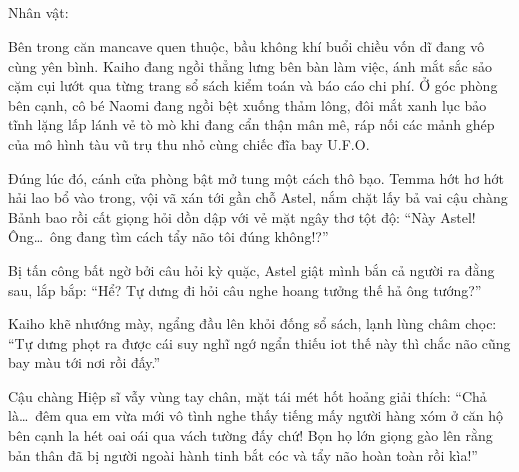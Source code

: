 \documentclass[../main.tex]{subfiles}
\begin{document}

\vspace{-60pt}

\subsection*{\label{ep-M34.I}}
\vspace{-4pt}
\begin{center}
    {\caviar\fontsize{12pt}{12pt}\selectfont Nhân vật:    }
\end{center}

Bên trong căn mancave quen thuộc, bầu không khí buổi chiều vốn dĩ đang vô cùng yên bình. Kaiho đang ngồi thẳng lưng bên bàn làm việc, ánh mắt sắc sảo cặm cụi lướt qua từng trang sổ sách kiểm toán và báo cáo chi phí. Ở góc phòng bên cạnh, cô bé Naomi đang ngồi bệt xuống thảm lông, đôi mắt xanh lục bảo tĩnh lặng lấp lánh vẻ tò mò khi đang cẩn thận mân mê, ráp nối các mảnh ghép của mô hình tàu vũ trụ thu nhỏ cùng chiếc đĩa bay U.F.O.

Đúng lúc đó, cánh cửa phòng bật mở tung một cách thô bạo.  Temma hớt hơ hớt hải lao bổ vào trong, vội vã xán tới gần chỗ  Astel, nắm chặt lấy bả vai cậu chàng Bảnh bao rồi cất giọng hỏi dồn dập với vẻ mặt ngây thơ tột độ: ``Này Astel! Ông\dots\ ông đang tìm cách tẩy não tôi đúng không!?''

Bị tấn công bất ngờ bởi câu hỏi kỳ quặc, Astel giật mình bắn cả người ra đằng sau, lắp bắp: ``Hể? Tự dưng đi hỏi câu nghe hoang tưởng thế hả ông tướng?''


Kaiho khẽ nhướng mày, ngẩng đầu lên khỏi đống sổ sách, lạnh lùng châm chọc: ``Tự dưng phọt ra được cái suy nghĩ ngớ ngẩn thiếu iot thế này thì chắc não cũng bay màu tới nơi rồi đấy.''

Cậu chàng Hiệp sĩ vẫy vùng tay chân, mặt tái mét hốt hoảng giải thích: ``Chả là\dots\ đêm qua em vừa mới vô tình nghe thấy tiếng mấy người hàng xóm ở căn hộ bên cạnh la hét oai oái qua vách tường đấy chứ! Bọn họ lớn giọng gào lên rằng bản thân đã bị người ngoài hành tinh bắt cóc và tẩy não hoàn toàn rồi kìa!''
\end{document}

